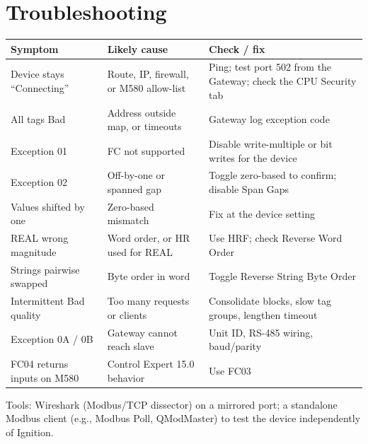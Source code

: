 \section{Troubleshooting}
\begin{longtable}{@{}P{4.34cm}P{4.99cm}P{6.30cm}@{}}
\toprule
\textbf{Symptom} & \textbf{Likely cause} & \textbf{Check / fix} \\
\midrule
\endhead
Device stays ``Connecting'' & Route, IP, firewall, or M580 allow-list & Ping; test port 502 from the Gateway; check the CPU Security tab \\
All tags Bad & Address outside map, or timeouts & Gateway log exception code \\
Exception 01 & FC not supported & Disable write-multiple or bit writes for the device \\
Exception 02 & Off-by-one or spanned gap & Toggle zero-based to confirm; disable Span Gaps \\
Values shifted by one & Zero-based mismatch & Fix at the device setting \\
REAL wrong magnitude & Word order, or HR used for REAL & Use HRF; check Reverse Word Order \\
Strings pairwise swapped & Byte order in word & Toggle Reverse String Byte Order \\
Intermittent Bad quality & Too many requests or clients & Consolidate blocks, slow tag groups, lengthen timeout \\
Exception 0A / 0B & Gateway cannot reach slave & Unit ID, RS-485 wiring, baud/parity \\
FC04 returns inputs on M580 & Control Expert 15.0 behavior & Use FC03 \\
\bottomrule
\end{longtable}
Tools: Wireshark (Modbus/TCP dissector) on a mirrored port; a standalone Modbus client (e.g., Modbus Poll, QModMaster) to test the device independently of Ignition.

